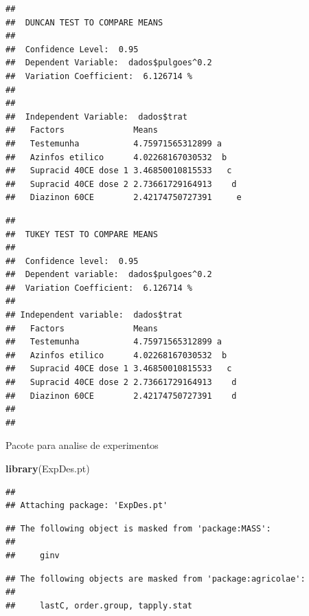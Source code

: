 \documentclass[
]{book}
\newenvironment{Shaded}{\begin{snugshade}}{\end{snugshade}}
\newcommand{\KeywordTok}[1]{\textcolor[rgb]{0.13,0.29,0.53}{\textbf{#1}}}
\newcommand{\NormalTok}[1]{#1}
\newcommand{\StringTok}[1]{\textcolor[rgb]{0.31,0.60,0.02}{#1}}
\begin{document}
\begin{verbatim}
## 
##  DUNCAN TEST TO COMPARE MEANS 
##  
##  Confidence Level:  0.95 
##  Dependent Variable:  dados$pulgoes^0.2
##  Variation Coefficient:  6.126714 % 
##  
## 
##  Independent Variable:  dados$trat 
##   Factors              Means                 
##   Testemunha           4.75971565312899 a    
##   Azinfos etilico      4.02268167030532  b   
##   Supracid 40CE dose 1 3.46850010815533   c  
##   Supracid 40CE dose 2 2.73661729164913    d 
##   Diazinon 60CE        2.42174750727391     e
\end{verbatim}

\begin{Shaded}
\end{Shaded}

\begin{verbatim}
## 
##  TUKEY TEST TO COMPARE MEANS 
##  
##  Confidence level:  0.95 
##  Dependent variable:  dados$pulgoes^0.2
##  Variation Coefficient:  6.126714 % 
##  
## Independent variable:  dados$trat 
##   Factors              Means                
##   Testemunha           4.75971565312899 a   
##   Azinfos etilico      4.02268167030532  b  
##   Supracid 40CE dose 1 3.46850010815533   c 
##   Supracid 40CE dose 2 2.73661729164913    d
##   Diazinon 60CE        2.42174750727391    d
## 
## 
\end{verbatim}

Pacote para analise de experimentos

\begin{Shaded}
\begin{Highlighting}[]
\KeywordTok{library}\NormalTok{(ExpDes.pt)}
\end{Highlighting}
\end{Shaded}

\begin{verbatim}
## 
## Attaching package: 'ExpDes.pt'
\end{verbatim}

\begin{verbatim}
## The following object is masked from 'package:MASS':
## 
##     ginv
\end{verbatim}

\begin{verbatim}
## The following objects are masked from 'package:agricolae':
## 
##     lastC, order.group, tapply.stat
\end{verbatim}
\end{document}
